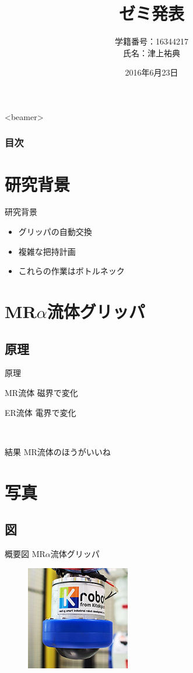 \documentclass[dvipdfmx]{beamer}
\title{\bfseries ゼミ発表}
\author{学籍番号：16344217 \\氏名：津上祐典}
\institute[]{九州工業大学大学院　工学府\\機械知能工学専攻　知能制御工学コー
ス　西田研究室}
\date{2016年6月23日}
\begin{document}
\begin{frame}
 \titlepage 
\end{frame}

\begin{frame}<beamer> 
  \frametitle{目次}
  \tableofcontents
\end{frame}

\section{研究背景} %
\begin{frame}{研究背景} %
 \begin{itemize}
  \item グリッパの自動交換
  \item 複雑な把持計画
  \item これらの作業は\alert{ボトルネック}
 \end{itemize}
\end{frame} 

\section{MR$\alpha$流体グリッパ}

\subsection{原理}
\begin{frame}{原理}
\begin{block}{MR流体} 
磁界で変化
\end{block}
\begin{block}{ER流体}
電界で変化
\end{block}

\pause　%
\begin{alertblock}{結果}
MR流体のほうがいいね
\end{alertblock}
\end{frame}



\section{写真}

\subsection{図}

\begin{frame}{概要図}
MR$\alpha$流体グリッパ
\begin{figure}
\includegraphics[scale=1,bb = 0 0 171 171]{fig/s_gripperp.png}
\end{figure}
\end{frame}
\end{document}
